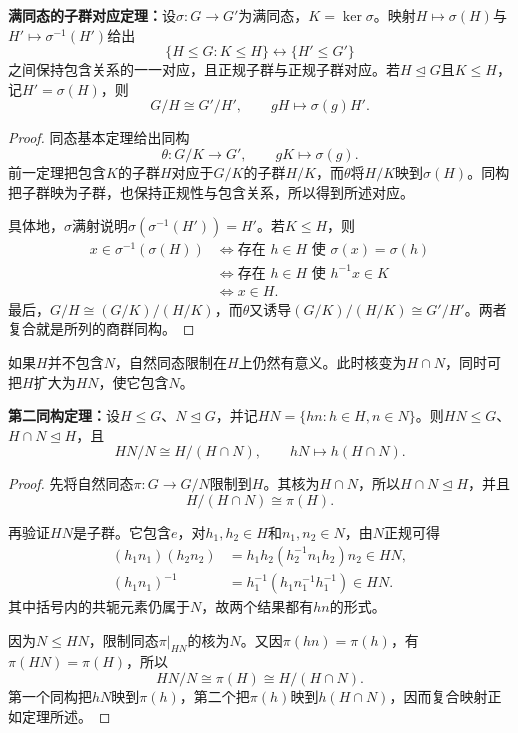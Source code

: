 \begin{theorem}\label{p2:correspondence-onto}
\textbf{满同态的子群对应定理：}设$\sigma:G\to G'$为满同态，$K=\ker\sigma$。映射$H\mapsto\sigma(H)$与$H'\mapsto\sigma^{-1}(H')$给出
\[
\{H\leq G:K\leq H\}\longleftrightarrow\{H'\leq G'\}
\]
之间保持包含关系的一一对应，且正规子群与正规子群对应。若$H\trianglelefteq G$且$K\leq H$，记$H'=\sigma(H)$，则
\[
G/H\cong G'/H',\qquad gH\longmapsto\sigma(g)H'.
\]
\end{theorem}
\begin{proof}
同态基本定理给出同构
\[
\theta:G/K\longrightarrow G',\qquad gK\longmapsto\sigma(g).
\]
前一定理把包含$K$的子群$H$对应于$G/K$的子群$H/K$，而$\theta$将$H/K$映到$\sigma(H)$。同构把子群映为子群，也保持正规性与包含关系，所以得到所述对应。

具体地，$\sigma$满射说明$\sigma(\sigma^{-1}(H'))=H'$。若$K\leq H$，则
\begin{align*}
x\in\sigma^{-1}(\sigma(H))
&\iff\text{存在 }h\in H\text{ 使 }\sigma(x)=\sigma(h)\\
&\iff\text{存在 }h\in H\text{ 使 }h^{-1}x\in K\\
&\iff x\in H.
\end{align*}
最后，$G/H\cong(G/K)/(H/K)$，而$\theta$又诱导$(G/K)/(H/K)\cong G'/H'$。两者复合就是所列的商群同构。
\end{proof}

如果$H$并不包含$N$，自然同态限制在$H$上仍然有意义。此时核变为$H\cap N$，同时可把$H$扩大为$HN$，使它包含$N$。

\begin{theorem}\label{p2:second-iso}
\textbf{第二同构定理：}设$H\leq G$、$N\trianglelefteq G$，并记$HN=\{hn:h\in H,n\in N\}$。则$HN\leq G$、$H\cap N\trianglelefteq H$，且
\[
HN/N\cong H/(H\cap N),\qquad hN\longmapsto h(H\cap N).
\]
\end{theorem}
\begin{proof}
先将自然同态$\pi:G\to G/N$限制到$H$。其核为$H\cap N$，所以$H\cap N\trianglelefteq H$，并且
\[
H/(H\cap N)\cong\pi(H).
\]

再验证$HN$是子群。它包含$e$，对$h_1,h_2\in H$和$n_1,n_2\in N$，由$N$正规可得
\begin{align*}
(h_1n_1)(h_2n_2)
&=h_1h_2(h_2^{-1}n_1h_2)n_2\in HN,\\
(h_1n_1)^{-1}
&=h_1^{-1}(h_1n_1^{-1}h_1^{-1})\in HN.
\end{align*}
其中括号内的共轭元素仍属于$N$，故两个结果都有$hn$的形式。

因为$N\leq HN$，限制同态$\pi|_{HN}$的核为$N$。又因$\pi(hn)=\pi(h)$，有$\pi(HN)=\pi(H)$，所以
\[
HN/N\cong\pi(H)\cong H/(H\cap N).
\]
第一个同构把$hN$映到$\pi(h)$，第二个把$\pi(h)$映到$h(H\cap N)$，因而复合映射正如定理所述。
\end{proof}

